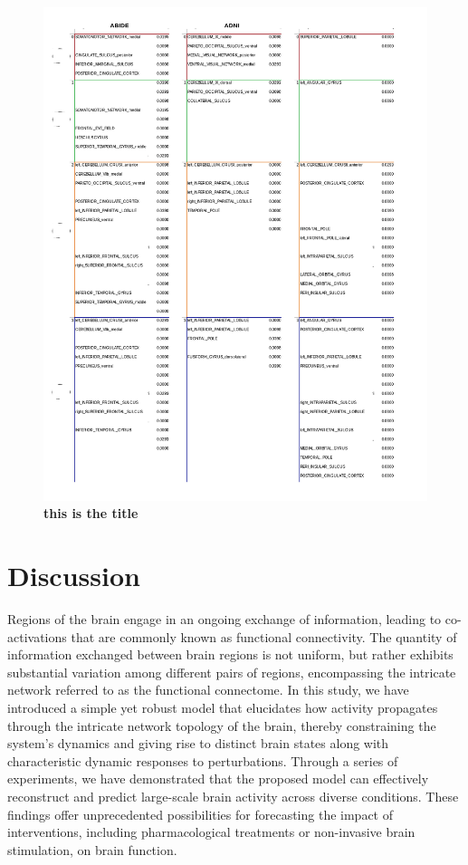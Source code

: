 \documentclass{article}
\begin{document}
\begin{figure}[!htbp]
\centering
\includegraphics[width=0.7\linewidth]{files/clinical_results_com-3977f73315af9d195443a4395eed5978.png}
\caption[]{\textbf{this is the title}}
\label{clinical-results-table}
\end{figure}

\section{Discussion}\label{Discussion}

Regions of the brain engage in an ongoing exchange of information, leading to co-activations that are commonly known as
functional connectivity. The quantity of information exchanged between brain regions is not uniform, but rather exhibits
substantial variation among different pairs of regions, encompassing the intricate network referred to as the functional
connectome. In this study, we have introduced a simple yet robust model that elucidates how activity propagates through
the intricate network topology of the brain, thereby constraining the system's dynamics and giving rise to distinct
brain states along with characteristic dynamic responses to perturbations. Through a series of experiments, we have
demonstrated that the proposed model can effectively reconstruct and predict large-scale brain activity across diverse
conditions. These findings offer unprecedented possibilities for forecasting the impact of interventions, including
pharmacological treatments or non-invasive brain stimulation, on brain function.
\end{document}
